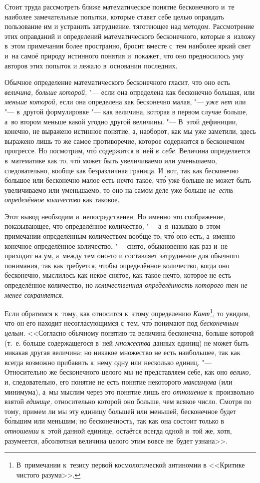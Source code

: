 Стоит труда рассмотреть ближе математическое понятие бесконечного и~те наиболее
замечательные попытки, которые ставят себе целью оправдать пользование им
и устранить затруднение, тяготеющее над методом. Рассмотрение этих оправданий
и определений математического бесконечного, которые я~изложу в~этом примечании
более пространно, бросит вместе с~тем наиболее яркий свет и~на самоё природу
истинного понятия и~покажет, что оно предносилось уму авторов этих попыток
и лежало в~основании последних.

Обычное определение математического бесконечного гласит, что оно есть
{\em величина, больше которой,} "--- если она определена как бесконечно
большая, или {\em меньше которой,} если она определена как бесконечно малая,
"--- {\em уже нет} или "--- в~другой формулировке "--- как величина, которая
в первом случае больше, а~во втором меньше какой угодно другой величины. "---
В~этой дефиниции, конечно, не выражено истинное понятие, а, наоборот, как мы
уже заметили, здесь выражено лишь то же самое противоречие, которое содержится
в бесконечном прогрессе. Но посмотрим, чт\'{о} содержится в~ней
{\em в~себе}. Величина определяется в~математике как то, чт\'{о} может быть
увеличиваемо или уменьшаемо, следовательно, вообще как безразличная граница.
И~вот, так как бесконечно большое или бесконечно малое есть нечто такое, чт\'{о}
уже больше не может быть увеличиваемо или уменьшаемо, то оно на самом деле уже
больше {\em не~есть определённое количество} как таковое.

Этот вывод необходим и~непосредственен. Но именно это соображение,
показывающее, что определённое количество, "--- а~я~называю в~этом примечании
определённым количеством вообще то, чт\'{о} оно есть, а~именно конечное определённое количество,
"--- снято, обыкновенно как раз и~не приходит на ум, а~между тем оно-то
и составляет затруднение для обычного понимания, так как требуется, чтобы
определённое количество, когда оно бесконечно, мыслилось как некое снятое,
как такое нечто, которое не есть определённое количество, но
{\em количественная определённость которого тем не менее сохраняется}.

Если обратимся к~тому, как относится к~этому определению
{\em Кант}\footnote{В~примечании к~тезису первой космологической антиномии
в <<Критике чистого разума>>.}, то увидим, что он его находит несогласующимся
с~тем, чт\'{о} понимают под {\em бесконечным целым}. <<Согласно обычному
понятию та величина бесконечна, больше которой (т.~е. больше содержащегося
в~ней {\em множества} данных единиц) не может быть никакая другая величина; но
никакое множество не есть наибольшее, так как всегда возможно прибавить к~нему
одну или несколько единиц. "--- Относительно же бесконечного целого мы не
представляем себе, как оно {\em велико,} и, следовательно, его понятие не есть
понятие некоторого {\em максимума} (или минимума), а~мы мыслим через это
понятие лишь его {\em отношение} к~произвольно взятой {\em единице,}
относительно которой оно больше, чем всякое число. Смотря по тому, примем ли
мы эту единицу большей или меньшей, бесконечное будет б\'{о}льшим или меньшим; но
бесконечность, так как она состоит только в {\em отношении} к~этой данной
единице, остаётся всегда одной и~той же, хотя, разумеется, абсолютная величина
целого этим вовсе не~будет узнана>>.

